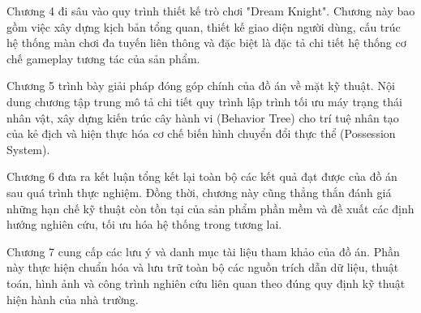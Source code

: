 \documentclass[../DoAn.tex]{subfiles}
\begin{document}
Chương 4 đi sâu vào quy trình thiết kế trò chơi "Dream Knight". Chương này bao gồm việc xây dựng kịch bản tổng quan, thiết kế giao diện người dùng, cấu trúc hệ thống màn chơi đa tuyến liên thông và đặc biệt là đặc tả chi tiết hệ thống cơ chế gameplay tương tác của sản phẩm.

Chương 5 trình bày giải pháp đóng góp chính của đồ án về mặt kỹ thuật. Nội dung chương tập trung mô tả chi tiết quy trình lập trình tối ưu máy trạng thái nhân vật, xây dựng kiến trúc cây hành vi (Behavior Tree) cho trí tuệ nhân tạo của kẻ địch và hiện thực hóa cơ chế biến hình chuyển đổi thực thể (Possession System).

Chương 6 đưa ra kết luận tổng kết lại toàn bộ các kết quả đạt được của đồ án sau quá trình thực nghiệm. Đồng thời, chương này cũng thẳng thắn đánh giá những hạn chế kỹ thuật còn tồn tại của sản phẩm phần mềm và đề xuất các định hướng nghiên cứu, tối ưu hóa hệ thống trong tương lai.

Chương 7 cung cấp các lưu ý và danh mục tài liệu tham khảo của đồ án. Phần này thực hiện chuẩn hóa và lưu trữ toàn bộ các nguồn trích dẫn dữ liệu, thuật toán, hình ảnh và công trình nghiên cứu liên quan theo đúng quy định kỹ thuật hiện hành của nhà trường.
\end{document}
